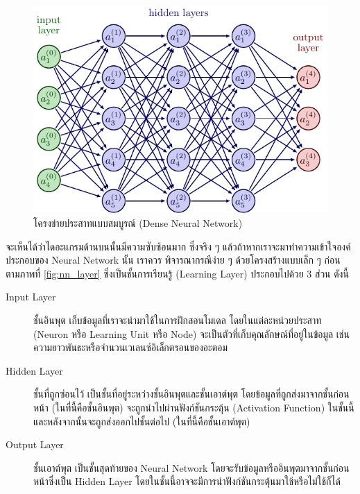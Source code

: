 \begin{figure}[htbp]
    \includegraphics[width=\linewidth]{fig/dense_neural_net.pdf}
    \caption{โครงข่ายประสาทแบบสมบูรณ์ (Dense Neural Network)}
    \label{fig:dense_neural_net}
\end{figure}

จะเห็นได้ว่าไดอะแกรมด้านบนนั้นมีความซับซ้อนมาก ซึ่งจริง ๆ แล้วถ้าหากเราจะมาทำความเข้าใจองค์ประกอบของ Neural Network นั้น เราควร%
พิจารณากรณีง่าย ๆ ด้วยโครงสร้างแบบเล็ก ๆ ก่อน ตามภาพที่ \ref{fig:nn_layer} ซึ่งเป็นชั้นการเรียนรู้ (Learning Layer) ประกอบไปด้วย
3 ส่วน ดังนี้

\begin{description}
    \item[Input Layer] ชั้นอินพุต เก็บข้อมูลที่เราจะนำมาใช้ในการฝึกสอนโมเดล โดยในแต่ละหน่วยประสาท (Neuron หรือ Learning Unit 
    หรือ Node) จะเป็นตัวที่เก็บคุณลักษณ์ที่อยู่ในข้อมูล เช่น ความยาวพันธะหรือจำนวนเวเลนซ์อิเล็กตรอนของอะตอม
    
    \item[Hidden Layer] ชั้นที่ถูกซ่อนไว้ เป็นชั้นที่อยู่ระหว่างชั้นอินพุตและชั้นเอาต์พุต โดยข้อมูลที่ถูกส่งมาจากชั้นก่อนหน้า (ในที่นี้คือชั้นอินพุต)
    จะถูกนำไปผ่านฟังก์ชันกระตุ้น (Activation Function) ในชั้นนี้ และหลังจากนั้นจะถูกส่งออกไปชั้นต่อไป (ในที่นี้คือชั้นเอาต์พุต)
    
    \item[Output Layer] ชั้นเอาต์พุต เป็นชั้นสุดท้ายของ Neural Network โดยจะรับข้อมูลหรืออินพุตมาจากชั้นก่อนหน้าซึ่งเป็น Hidden 
    Layer โดยในชั้นนี้อาจจะมีการนำฟังก์ชันกระตุ้นมาใช้หรือไม่ใช้ก็ได้
\end{description}

